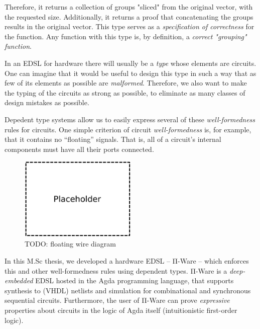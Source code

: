 \documentclass[a4paper,draft]{report}
\begin{document}
        Therefore, it returns a collection of groups "sliced" from the original vector, with the requested size.
        Additionally, it returns a proof that concatenating the groups results in the original vector.
        This type serves as a \emph{specification of correctness} for the function.
        Any function with this type is, by definition, a \emph{correct "grouping" function}.

        In an \ac{EDSL} for hardware there will usually be a \emph{type} whose elements are circuits.
        One can imagine that it would be useful to design this type in such a way that as few of its elements as possible are \emph{malformed}.
        Therefore, we also want to make the typing of the circuits as strong as possible,
        to eliminate as many classes of design mistakes as possible.


        Depedent type systems allow us to easily express several of these \emph{well-formedness} rules for circuits.
        One simple criterion of circuit \emph{well-formedness} is, for example, that it contains no ``floating'' signals.
        That is, all of a circuit's internal components must have all their ports connected. %

        \begin{figure}[h]
            \centerline{\includegraphics[width=0.5\textwidth]{imgs/floating-wire.pdf}}
            \caption{TODO: floating wire diagram \label{fig:floating-wire}}
        \end{figure}

        In this M.Sc thesis, we developed a hardware \ac{EDSL} -- Π-Ware -- which enforces this and other
        well-formedness rules using dependent types.
        Π-Ware is a \emph{deep-embedded} \ac{EDSL} hosted in the Agda programming language,
        that supports synthesis to (VHDL) netlists and simulation for combinational and synchronous sequential circuits.
        Furthermore, the user of Π-Ware can prove \emph{expressive} properties about circuits in the logic
        of Agda itself (intuitionistic first-order logic).
\end{document}
